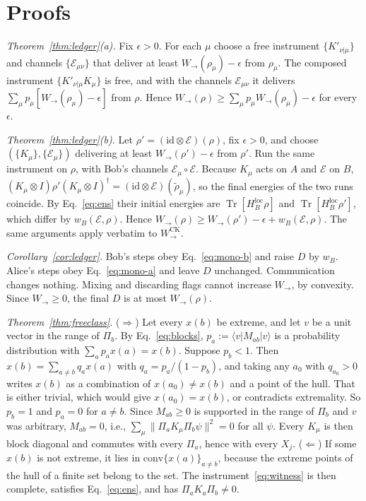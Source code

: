 \documentclass[aps,pra,twocolumn,reprint,superscriptaddress,nofootinbib,floatfix]{revtex4-2}
\theoremstyle{plain}
\theoremstyle{remark}
\newcommand{\Tr}{\operatorname{Tr}}
\newcommand{\id}{\mathrm{id}}
\newcommand{\Wto}{W_{\to}}
\newcommand{\WCK}{W_{\to}^{\mathrm{CK}}}
\newcommand{\HBl}{H_B^{\mathrm{loc}}}
\newcommand{\E}{\mathcal{E}}
\newcommand{\ket}[1]{|#1\rangle}
\newcommand{\bra}[1]{\langle #1|}
\begin{document}
\section{Proofs}
\label{app:proofs}

\emph{Theorem~\ref{thm:ledger}(a).} Fix $\epsilon>0$. For each $\mu$ choose a free
instrument $\{K'_{\nu|\mu}\}$ and channels $\{\E_{\mu\nu}\}$ that deliver at least
$\Wto(\rho_\mu)-\epsilon$ from $\rho_\mu$. The composed instrument $\{K'_{\nu|\mu}K_\mu\}$ is
free, and with the channels $\E_{\mu\nu}$ it delivers
$\sum_\mu p_\mu[\Wto(\rho_\mu)-\epsilon]$ from $\rho$. Hence
$\Wto(\rho)\ge\sum_\mu p_\mu\Wto(\rho_\mu)-\epsilon$ for every $\epsilon$.

\emph{Theorem~\ref{thm:ledger}(b).} Let $\rho'=(\id\otimes\E)(\rho)$, fix $\epsilon>0$, and
choose $(\{K_\mu\},\{\E_\mu\})$ delivering at least $\Wto(\rho')-\epsilon$ from $\rho'$. Run
the same instrument on $\rho$, with Bob's channels $\E_\mu\circ\E$. Because $K_\mu$ acts on $A$
and $\E$ on $B$, $(K_\mu\otimes I)\rho'(K_\mu\otimes I)^\dagger=(\id\otimes\E)(\tilde\rho_\mu)$,
so the final energies of the two runs coincide. By Eq.~\eqref{eq:ens} their initial energies
are $\Tr[\HBl\rho]$ and $\Tr[\HBl\rho']$, which differ by $w_B(\E,\rho)$. Hence
$\Wto(\rho)\ge\Wto(\rho')-\epsilon+w_B(\E,\rho)$. The same arguments apply verbatim to $\WCK$.

\emph{Corollary~\ref{cor:ledger}.} Bob's steps obey Eq.~\eqref{eq:mono-b} and raise $D$ by
$w_B$. Alice's steps obey Eq.~\eqref{eq:mono-a} and leave $D$ unchanged. Communication
changes nothing. Mixing and discarding flags cannot increase $\Wto$, by convexity. Since
$\Wto\ge0$, the final $D$ is at most $\Wto(\rho)$.

\emph{Theorem~\ref{thm:freeclass}.} ($\Rightarrow$) Let every $x(b)$ be extreme, and let $v$
be a unit vector in the range of $\Pi_b$. By Eq.~\eqref{eq:blocks}, $p_a:=\bra vM_{ab}\ket v$
is a probability distribution with $\sum_ap_ax(a)=x(b)$. Suppose $p_b<1$. Then
$x(b)=\sum_{a\ne b}q_ax(a)$ with $q_a=p_a/(1-p_b)$, and taking any $a_0$ with $q_{a_0}>0$
writes $x(b)$ as a combination of $x(a_0)\ne x(b)$ and a point of the hull. That is either
trivial, which would give $x(a_0)=x(b)$, or contradicts extremality. So $p_b=1$ and $p_a=0$
for $a\ne b$. Since $M_{ab}\ge0$ is supported in the range of $\Pi_b$ and $v$ was arbitrary,
$M_{ab}=0$, i.e., $\sum_\mu\|\Pi_aK_\mu\Pi_b\psi\|^2=0$ for all $\psi$. Every $K_\mu$ is
then block diagonal and commutes with every $\Pi_a$, hence with every $X_j$. ($\Leftarrow$)
If some $x(b)$ is not extreme, it lies in $\mathrm{conv}\{x(a)\}_{a\ne b}$, because the extreme
points of the hull of a finite set belong to the set. The instrument~\eqref{eq:witness} is
then complete, satisfies Eq.~\eqref{eq:ens}, and has $\Pi_aK_a\Pi_b\ne0$.
\end{document}

